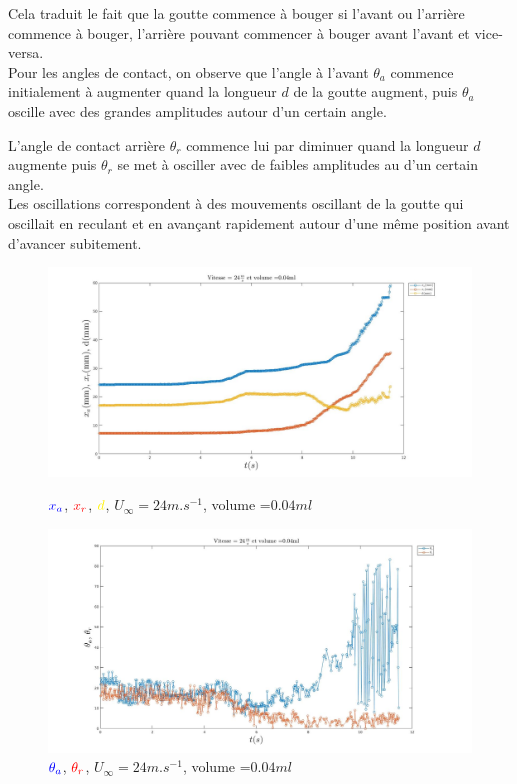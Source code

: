 Cela traduit le fait que la goutte commence à bouger si l'avant ou l'arrière commence à bouger, l'arrière pouvant commencer à bouger avant l'avant et vice-versa.\\

Pour les angles de contact, on observe que l'angle à l'avant $\theta_{a}$ commence initialement à augmenter quand la longueur $d$ de la goutte augment, puis $\theta_{a}$ oscille avec des grandes amplitudes autour d'un certain angle.

L'angle de contact arrière $\theta_{r}$ commence lui par diminuer quand la longueur $d$ augmente puis $\theta_{r}$ se met à osciller avec de faibles amplitudes au d'un certain angle.\\

Les oscillations correspondent à des mouvements oscillant de la goutte qui oscillait en reculant et en avançant rapidement autour d'une même position avant d'avancer subitement.

\newpage
\begin{figure}[!ht]
	\centering
	\begin{minipage}{0.8\linewidth}
		\includegraphics[width=\linewidth]{./image/v=24_vol=004_xaxrd.jpg}
		\caption{$\textcolor{blue}{x_{a}}$,
		$\textcolor{red}{x_{r}}$, $\textcolor{yellow}{d}$, 
		$U_{\infty}=24m.s^{-1}$, volume =$0.04ml$}
		\label{fig:entre_xaxrd}
	\end{minipage}
	\vfill
	\begin{minipage}{0.8\linewidth}
		\includegraphics[width=\linewidth]{./image/v=24_vol=004_oaor.jpg}
		\caption{$\textcolor{blue}{\theta_{a}}$,
		$\textcolor{red}{\theta_{r}}$, $U_{\infty}=24m.s^{-1}$, volume =$0.04ml$}
		\label{fig:entre_oaor}
	\end{minipage}
 \end{figure}


